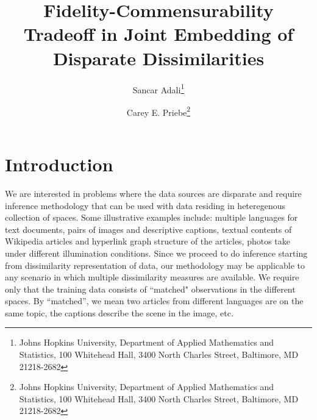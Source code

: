 \documentclass[11pt]{article} %
\title{ Fidelity-Commensurability Tradeoff in Joint Embedding of Disparate Dissimilarities}
\author{Sancar Adali\thanks{Johns Hopkins University,
Department of Applied Mathematics and Statistics,
100 Whitehead Hall,
3400 North Charles Street,
Baltimore, MD 21218-2682} \and Carey E. Priebe\thanks{Johns Hopkins University,
Department of Applied Mathematics and Statistics,
100 Whitehead Hall,
3400 North Charles Street,
Baltimore, MD 21218-2682}
}
\begin{document}
\maketitle
\abstract{
}




\section{Introduction}
  We are interested in problems where the data sources  are disparate and require inference methodology that can be used with data residing in heteregenous collection of  spaces.  Some illustrative examples include:  multiple languages for text documents, pairs of images and descriptive captions,  textual contents of Wikipedia articles and  hyperlink graph
structure of the articles, photos take under different illumination conditions. Since we proceed to do inference starting from dissimilarity representation of data, our methodology may be applicable to any scenario in which multiple dissimilarity measures are available.
We require only that the training data consists of ``matched" observations in the different spaces. By ``matched'', we mean two articles from different languages are on the same topic, the captions describe the scene in the image, etc.

\end{document}
